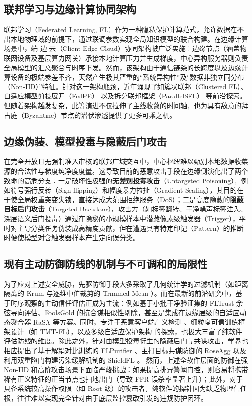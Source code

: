 \documentclass[runningheads]{llncs}
\begin{document}
\subsection{联邦学习与边缘计算协同架构}
联邦学习（Federated Learning, FL）作为一种隐私保护计算范式，允许数据在不出本地物理域的前提下，通过联调参数实现全局知识模型的联合构建。在边缘计算场景中，端-边-云（Client-Edge-Cloud）协同架构被广泛实施：边缘节点（涵盖物联网设备及基层算力网关）承接本地计算压力并生成梯度，中心异构服务器则负责全局模型的汇总聚合与时序下发。然而，该架构由于通信链条的长跨度以及边缘计算设备的极端参差不齐，天然产生极其严重的“系统异构性”及“数据非独立同分布（Non-IID）”特征。针对这一架构瓶颈，近年涌现了如簇状联邦（Clustered FL）\cite{r9_clustered}、自适应模型剪枝展开（FedPE）\cite{fedpe} 以及拆分联邦框架（ParallelSFL）\cite{parallelsfl} 等前沿探索。但随着架构越发复杂，此等演进不仅拉伸了主线收敛的时间轴，也为具有敌意的拜占庭（Byzantine）节点的潜伏渗透提供了更多可乘之机。

\subsection{边缘伪装、模型投毒与隐蔽后门攻击}
在完全开放且无强制准入审核的联邦广域交互中，中心枢纽难以甄别本地数据收集源的合法性与梯度纯净度度量。这导致目前的恶意攻击手段在边缘侧演化出了两个致命的高危分支：一是破坏性极强的\textbf{无差别投毒攻击}（Untargeted Poisoning），例如符号强行反转（Sign-flipping）和幅度暴力拉扯（Gradient Scaling），其目的在于使全局权重突变失锁，直接达成大范围拒绝服务（DoS）；二是高度隐蔽的\textbf{隐蔽目标后门攻击}（Targeted Backdoor），攻击方（如标签翻转、干净噪声标签注入、深层语义后门投毒）通过在隐秘的小规模样本中潜藏像素级触发器（Trigger），平时对主导分类任务伪装成高精度贡献，但在遭遇具有特定印记（Pattern）的推断时便使模型对含触发器样本产生定向误分类。

\subsection{现有主动防御防线的机制与不可调和的局限性}
为了应对上述安全威胁，先驱防御手段大多采取了几何统计学的过滤机制（如距离隔离的 Krum \cite{blanchard2017krum} 与逐维中值裁剪的 Trimmed Mean \cite{yin2018byzantine}）。而在最新的前沿研究中，基于时序观察的主动信任评估正成为主流：例如基于小批干净验证集的 FLTrust 余弦导向评估\cite{cao2021fltrust}、FoolsGold 的抗合谋相似性剔除\cite{fung2020foolsgold}，甚至是集成在边缘层级的自适应动态聚合器 RaSA\cite{wang2025rasa} 等方案。同时，专注于恶意客户端广义检测 \cite{dou2025toward}、细粒度可信训练框架设计（如 TMT-FL）\cite{lu2025tmt}，以及多级自适应保护架构 \cite{wang2024federated} 的探索，也极大丰富了纯软件评估防线的维度。除此之外，针对由模型投毒衍生的隐蔽后门与共谋攻击，学界也相应提出了基于解耦对比训练的 FLPurifier \cite{flpurifier}、主打目标共谋防御的 RoseAgg \cite{roseagg} 以及利用双重陷门构建污染缓解机制的 ShieldFL \cite{shieldfl}。
然而，上述全软件层面的防御在强 Non-IID 和高阶攻击场景下面临严峻挑战：如果提高排异警阈门控，则容易将携带稀有正义特征的正当节点也扫地出门（导致 FPR 误杀率显著上升）；此外，对于具备系统较高操作权限（如 Root 级）的攻击者，纯软件的探针因为缺乏物理信任根，往往难以实现完全针对由于底层监控篡改引发的违规防护闭环。
\end{document}
